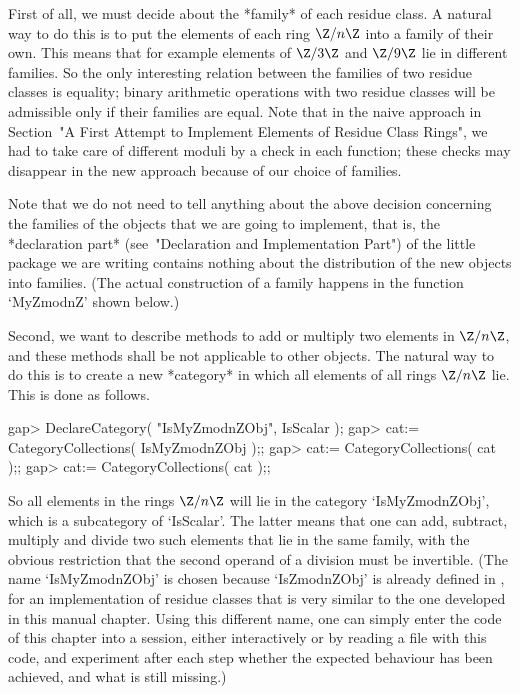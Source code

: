 First of all, we must decide about the *family* of each residue class.
A natural way to do this is to put the elements of each ring $\Z/n\Z$
into a family of their own.
This means that for example elements of $\Z/3\Z$ and $\Z/9\Z$ lie
in different families.
So the only interesting relation between the families of two residue
classes is equality;
binary arithmetic operations with two residue classes will be admissible
only if their families are equal.
Note that in the naive approach in Section~"A First Attempt to Implement
Elements of Residue Class Rings",
we had to take care of different moduli by a check in each function;
these checks may disappear in the new approach because of our choice
of families.

Note that we do not need to tell {\GAP} anything about the above
decision concerning the families of the objects that we are going to
implement,
that is, the *declaration part* (see~"Declaration and Implementation Part")
of the little {\GAP} package we are writing contains nothing about the
distribution of the new objects into families.
(The actual construction of a family happens in the function `MyZmodnZ'
shown below.)

Second, we want to describe methods to add or multiply two elements in
$\Z/n\Z$,
and these methods shall be not applicable to other {\GAP} objects.
The natural way to do this is to create a new *category* in which all
elements of all rings $\Z/n\Z$ lie.
This is done as follows.

\beginexample
gap> DeclareCategory( "IsMyZmodnZObj", IsScalar );
gap> cat:= CategoryCollections( IsMyZmodnZObj );;
gap> cat:= CategoryCollections( cat );;
gap> cat:= CategoryCollections( cat );;
\endexample

So all elements in the rings $\Z/n\Z$ will lie in the category
`IsMyZmodnZObj', which is a subcategory of `IsScalar'.
The latter means that one can add, subtract, multiply and divide
two such elements that lie in the same family,
with the obvious restriction that the second operand of a division
must be invertible.
(The name `IsMyZmodnZObj' is chosen because `IsZmodnZObj' is already
defined in {\GAP}, for an implementation of residue classes that is
very similar to the one developed in this manual chapter.
Using this different name, one can simply enter the {\GAP} code of this
chapter into a {\GAP} session, either interactively or by reading a file
with this code, and experiment after each step whether the expected
behaviour has been achieved, and what is still missing.)

